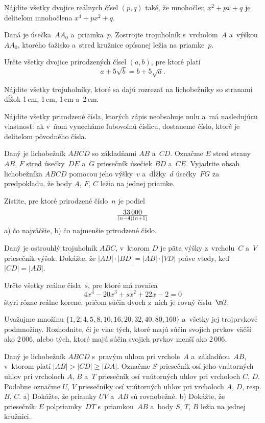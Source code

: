 {%
Nájdite všetky dvojice reálnych čísel $(p,q)$ také,
že mnohočlen $x^2+px+q$ je deliteľom mnohočlena $x^4+px^2+q$.}

{%
Daná je úsečka~$AA_0$ a~priamka~$p$. Zostrojte trojuholník
s~vrcholom~$A$ a~výškou~$AA_0$, ktorého ťažisko a~stred kružnice
opísanej ležia na priamke~$p$.}

{%
Určte všetky dvojice prirodzených čísel $(a,b)$, pre ktoré platí
$$
a+5\sqrt b=b+5\sqrt a.
$$}

{%
Nájdite všetky trojuholníky, ktoré sa dajú rozrezať na lichobežníky so
stranami dĺžok 1\,cm, 1\,cm, 1\,cm a~2\,cm.}

{%
Nájdite všetky prirodzené čísla, ktorých zápis neobsahuje nulu
a~má nasledujúcu vlastnosť: ak v~ňom vynecháme ľubovoľnú
číslicu, dostaneme číslo, ktoré je deliteľom pôvodného čísla.}

{%
Daný je lichobežník $ABCD$ so základňami $AB$ a~$CD$. Označme $E$
stred strany~$AB$, $F$ stred úsečky~$DE$ a~$G$ priesečník úsečiek
$BD$ a~$CE$. Vyjadrite obsah lichobežníka $ABCD$ pomocou jeho
výšky~$v$ a~dĺžky~$d$ úsečky~$FG$ za predpokladu, že body $A$,
$F$, $C$ ležia na jednej priamke.}

{%
Zistite, pre ktoré prirodzené číslo~$n$ je podiel
$$
33\,000\over(n-4)(n+1)
$$
a) čo najväčšie, b) čo najmenšie
prirodzené číslo.}

{%
Daný je ostrouhlý trojuholník $ABC$, v~ktorom $D$ je päta výšky
z~vrcholu~$C$ a~$V$ priesečník výšok. Dokážte, že
$|AD|\cdot|BD|=|AB|\cdot|VD|$ práve vtedy, keď $|CD|=|AB|$.}

{%
Určte všetky reálne čísla~$s$, pre ktoré má rovnica
$$
4x^4-20x^3+sx^2+22x-2=0
$$
štyri rôzne reálne korene, pričom súčin dvoch z~nich je rovný
číslu~$\m2$.}

{%
Uvažujme množinu $\{1,2,4,5,8,10,16,20,32,40,80,160\}$
a~všetky jej trojprvkové podmnožiny. Rozhodnite, či je viac tých,
ktoré majú súčin svojich prvkov väčší ako $2\,006$,
alebo tých, ktoré majú súčin svojich prvkov menší ako $2\,006$.}

{%
Daný je lichobežník $ABCD$ s~pravým uhlom pri vrchole~$A$ a~základňou~$AB$,
v~ktorom platí $|AB|>|CD|\ge |DA|$. Označme $S$
priesečník osí jeho vnútorných uhlov pri vrcholoch
$A$, $B$ a~$T$ priesečník osí vnútorných uhlov pri vrcholoch $C$, $D$. Podobne
označme $U$, $V$ priesečníky osí vnútorných uhlov pri vrcholoch
$A$, $D$, resp. $B$, $C$.
\ite a) Dokážte, že priamky $UV$ a~$AB$ sú rovnobežné.
\ite b) Dokážte, že priesečník~$E$ polpriamky~$DT$ s~priamkou~$AB$
        a~body $S$, $T$, $B$ ležia na jednej kružnici.}

